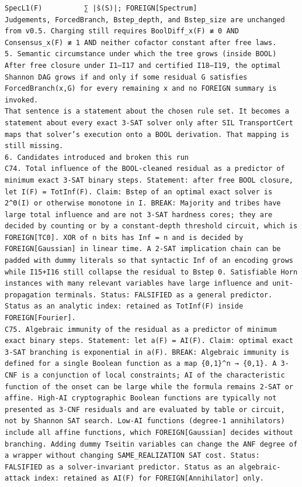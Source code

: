 \documentclass[11pt]{article}
\begin{document}
\begin{Verbatim}[breaklines=true,breakanywhere=true]
SpecL1(F)          ∑ |ŝ(S)|; FOREIGN[Spectrum]
Judgements, ForcedBranch, Bstep_depth, and Bstep_size are unchanged from v0.5. Charging still requires BoolDiff_x(F) ≢ 0 AND Consensus_x(F) ≢ 1 AND neither cofactor constant after free laws.
5. Semantic circumstance under which the tree grows (inside BOOL)
After free closure under I1–I17 and certified I18–I19, the optimal Shannon DAG grows if and only if some residual G satisfies ForcedBranch(x,G) for every remaining x and no FOREIGN summary is invoked.
That sentence is a statement about the chosen rule set. It becomes a statement about every exact 3-SAT solver only after SIL TransportCert maps that solver’s execution onto a BOOL derivation. That mapping is still missing.
6. Candidates introduced and broken this run
C74. Total influence of the BOOL-cleaned residual as a predictor of minimum exact 3-SAT binary steps. Statement: after free BOOL closure, let I(F) = TotInf(F). Claim: Bstep of an optimal exact solver is 2^Θ(I) or otherwise monotone in I. BREAK: Majority and tribes have large total influence and are not 3-SAT hardness cores; they are decided by counting or by a constant-depth threshold circuit, which is FOREIGN[TC0]. XOR of n bits has Inf = n and is decided by FOREIGN[Gaussian] in linear time. A 2-SAT implication chain can be padded with dummy literals so that syntactic Inf of an encoding grows while I15+I16 still collapse the residual to Bstep 0. Satisfiable Horn instances with many relevant variables have large influence and unit-propagation terminals. Status: FALSIFIED as a general predictor. Status as an analytic index: retained as TotInf(F) inside FOREIGN[Fourier].
C75. Algebraic immunity of the residual as a predictor of minimum exact binary steps. Statement: let a(F) = AI(F). Claim: optimal exact 3-SAT branching is exponential in a(F). BREAK: Algebraic immunity is defined for a single Boolean function as a map {0,1}^n → {0,1}. A 3-CNF is a conjunction of local constraints; AI of the characteristic function of the onset can be large while the formula remains 2-SAT or affine. High-AI cryptographic Boolean functions are typically not presented as 3-CNF residuals and are evaluated by table or circuit, not by Shannon SAT search. Low-AI functions (degree-1 annihilators) include all affine functions, which FOREIGN[Gaussian] decides without branching. Adding dummy Tseitin variables can change the ANF degree of a wrapper without changing SAME_REALIZATION SAT cost. Status: FALSIFIED as a solver-invariant predictor. Status as an algebraic-attack index: retained as AI(F) for FOREIGN[Annihilator] only.

\end{Verbatim}
\end{document}

